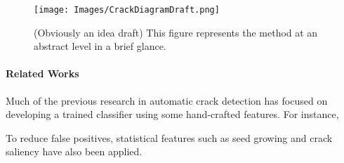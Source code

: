      


    \begin{figure}
    
        \begin{centering}
        
            \texttt{[image: Images/CrackDiagramDraft.png]}
        
            \caption{(Obviously an idea draft) This figure represents the method at an abstract level in a brief glance.}
            \label{fig:FigMain}
            
        \end{centering}
        
    \end{figure}

    \paragraph{Related Works}
        Much of the previous research in automatic crack detection has focused on developing a trained classifier using some hand-crafted features. For instance, 
        
        
        
        To reduce false positives, statistical features such as seed growing \cite{Li2011} and crack saliency \cite{Xu2013} have also been applied. 
        
